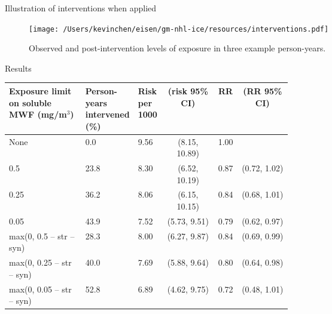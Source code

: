 \documentclass[
  11pt,
  ignorenonframetext,
]{beamer}
\begin{document}
\begin{frame}{Illustration of interventions when applied}
\protect\hypertarget{illustration-of-interventions-when-applied}{}
\begin{figure}
\centering
\texttt{[image: /Users/kevinchen/eisen/gm-nhl-ice/resources/interventions.pdf]}
\caption{Observed and post-intervention levels of exposure in three
example person-years.}
\end{figure}
\end{frame}

\begin{frame}{Results}
\protect\hypertarget{results}{}
\scriptsize\setlength{\tabcolsep}{3pt}
\begin{table}[ht]
\centering
\begin{tabular}{p{0.27\linewidth}C{0.18\linewidth}C{0.1\linewidth}ccc}
  \hline
Exposure limit on soluble MWF (mg/m$^3$) & Person-years intervened (\%) & Risk per 1000 & (risk 95\% CI) & RR & (RR 95\% CI) \\ 
  \hline
None & 0.0 & 9.56 & (8.15, 10.89) & 1.00 &  \\ 
  0.5 & 23.8 & 8.30 & (6.52, 10.19) & 0.87 & (0.72, 1.02) \\ 
  0.25 & 36.2 & 8.06 & (6.15, 10.15) & 0.84 & (0.68, 1.01) \\ 
  0.05 & 43.9 & 7.52 & (5.73, 9.51) & 0.79 & (0.62, 0.97) \\ 
  max(0, 0.5 – str – syn) & 28.3 & 8.00 & (6.27, 9.87) & 0.84 & (0.69, 0.99) \\ 
  max(0, 0.25 – str – syn) & 40.0 & 7.69 & (5.88, 9.64) & 0.80 & (0.64, 0.98) \\ 
  max(0, 0.05 – str – syn) & 52.8 & 6.89 & (4.62, 9.75) & 0.72 & (0.48, 1.01) \\ 
   \hline
\end{tabular}
\end{table}
\end{frame}
\end{document}
